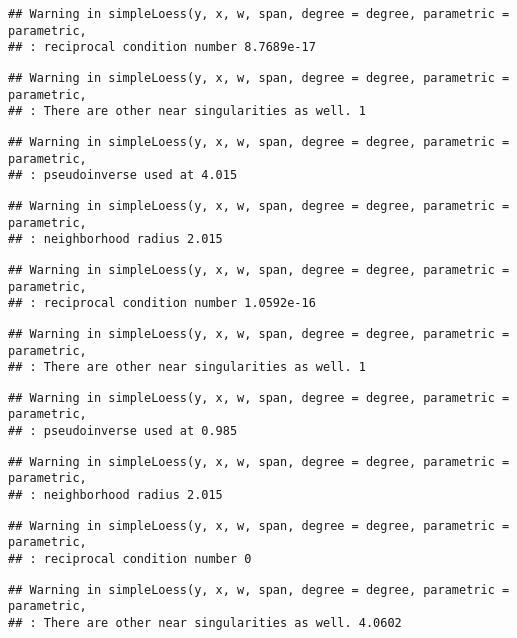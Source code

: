 \documentclass[
]{article}
\begin{document}
\begin{verbatim}
## Warning in simpleLoess(y, x, w, span, degree = degree, parametric = parametric,
## : reciprocal condition number 8.7689e-17
\end{verbatim}

\begin{verbatim}
## Warning in simpleLoess(y, x, w, span, degree = degree, parametric = parametric,
## : There are other near singularities as well. 1
\end{verbatim}

\begin{verbatim}
## Warning in simpleLoess(y, x, w, span, degree = degree, parametric = parametric,
## : pseudoinverse used at 4.015
\end{verbatim}

\begin{verbatim}
## Warning in simpleLoess(y, x, w, span, degree = degree, parametric = parametric,
## : neighborhood radius 2.015
\end{verbatim}

\begin{verbatim}
## Warning in simpleLoess(y, x, w, span, degree = degree, parametric = parametric,
## : reciprocal condition number 1.0592e-16
\end{verbatim}

\begin{verbatim}
## Warning in simpleLoess(y, x, w, span, degree = degree, parametric = parametric,
## : There are other near singularities as well. 1
\end{verbatim}

\begin{verbatim}
## Warning in simpleLoess(y, x, w, span, degree = degree, parametric = parametric,
## : pseudoinverse used at 0.985
\end{verbatim}

\begin{verbatim}
## Warning in simpleLoess(y, x, w, span, degree = degree, parametric = parametric,
## : neighborhood radius 2.015
\end{verbatim}

\begin{verbatim}
## Warning in simpleLoess(y, x, w, span, degree = degree, parametric = parametric,
## : reciprocal condition number 0
\end{verbatim}

\begin{verbatim}
## Warning in simpleLoess(y, x, w, span, degree = degree, parametric = parametric,
## : There are other near singularities as well. 4.0602
\end{verbatim}
\end{document}
